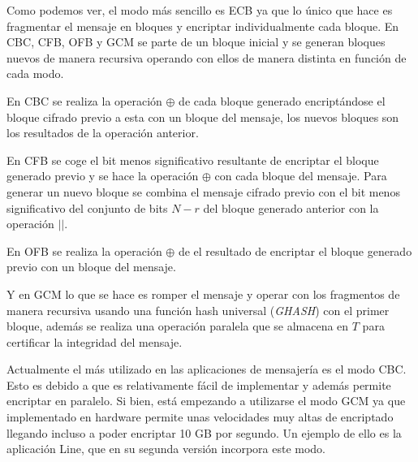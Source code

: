 Como podemos ver, el modo más sencillo es ECB ya que lo único que hace es fragmentar el mensaje en bloques y encriptar individualmente cada bloque. En CBC, CFB, OFB y GCM se parte de un bloque inicial y se generan bloques nuevos de manera recursiva operando con ellos de manera distinta en función de cada modo.

En CBC se realiza la operación $\oplus$ de cada bloque generado encriptándose el bloque cifrado previo a esta con un bloque del mensaje, los nuevos bloques son los resultados de la operación anterior.

En CFB se coge el bit menos significativo resultante de encriptar el bloque generado previo y se hace la operación $\oplus$ con cada bloque del mensaje. Para generar un nuevo bloque se combina el mensaje cifrado previo con el bit menos significativo del conjunto de bits $N-r$ del bloque generado anterior con la operación $||$.

En OFB se realiza la operación $\oplus$ de el resultado de encriptar el bloque generado previo con un bloque del mensaje.

Y en GCM lo que se hace es romper el mensaje y operar con los fragmentos de manera recursiva usando una función hash universal (\emph{GHASH}) con el primer bloque, además se realiza una operación paralela que se almacena en $T$ para certificar la integridad del mensaje.

Actualmente el más utilizado en las aplicaciones de mensajería es el modo CBC. Esto es debido a que es relativamente fácil de implementar y además permite encriptar en paralelo. Si bien, está empezando a utilizarse el modo GCM ya que implementado en hardware permite unas velocidades muy altas de encriptado llegando incluso a poder encriptar 10 GB por segundo. Un ejemplo de ello es la aplicación Line, que en su segunda versión incorpora este modo. 

